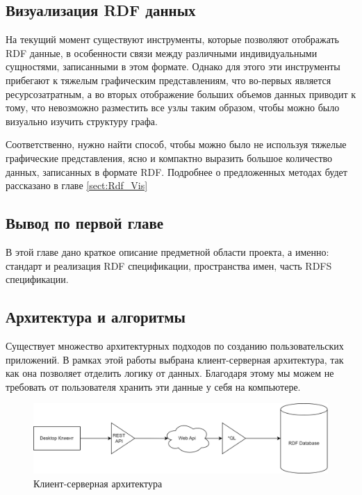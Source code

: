 \documentclass[12pt]{article}
\begin{document}
\subsection{Визуализация RDF данных}
\qquad На текущий момент существуют инструменты, которые позволяют отображать RDF данные, в особенности связи между различными индивидуальными сущностями, записанными в этом формате. Однако для этого эти инструменты прибегают к тяжелым графическим представлениям, что во-первых является ресурсозатратным, а во вторых отображение больших объемов данных приводит к тому, что невозможно разместить все узлы таким образом, чтобы можно было визуально изучить структуру графа.

Соответственно, нужно найти способ, чтобы можно было не используя тяжелые графические представления, ясно и компактно выразить большое количество данных, записанных в формате RDF. Подробнее о предложенных методах будет рассказано в главе \ref{sect:Rdf_Vis}

\subsection{Вывод по первой главе}
\qquad В этой главе дано краткое описание предметной области проекта, а именно: стандарт и реализация RDF спецификации, пространства имен, часть RDFS спецификации.

\pagebreak

\begin{center}
    {\section{Архитектура и алгоритмы}}
\end{center}

Существует множество архитектурных подходов по созданию пользовательских приложений. В рамках этой работы выбрана клиент-серверная архитектура, так как она позволяет отделить логику от данных. Благодаря этому мы можем не требовать от пользователя хранить эти данные у себя на компьютере.

\begin{figure}[!ht]
    \centering
    \includegraphics[width=1\textwidth]{_images/architecture.png}
    \caption{Клиент-серверная архитектура}
\end{figure}
\end{document}
